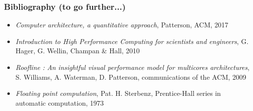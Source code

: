 \begin{frame}[containsverbatim]
\frametitle{Bibliography (to go further...)}
\begin{itemize}
\item \textit{Computer architecture, a quantitative approach}, Patterson, ACM, 2017
\item \textit{Introduction to High Performance Computing for scientists and engineers}, G. Hager, G. Wellin, Champan \& Hall, 2010
\item \textit{Roofline : An insightful visual performance model for multicores architectures}, S. Williams, A. Waterman, D. Patterson, communications of the ACM, 2009
\item \textit{Floating point computation}, Pat. H. Sterbenz, Prentice-Hall series in automatic computation, 1973
\end{itemize}
\end{frame}




